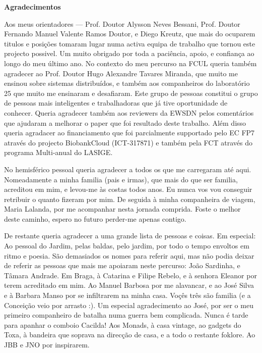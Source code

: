 \pagestyle{plain}

\vspace*{2cm}
\begin{center}
\Large \bf Agradecimentos
\end{center}
\vspace*{1cm} \setlength{\baselineskip}{0.6cm}
Aos meus orientadores --- Prof. Doutor Alysson Neves Bessani, Prof. Doutor Fernando Manuel Valente Ramos Doutor, e  Diego Kreutz, que mais do ocuparem titulos e posições tomaram lugar numa activa equipa de trabalho que tornou este projecto possivel. 
Um muito obrigado por toda a paciência, apoio, e confiança ao longo do meu último ano. 
No contexto do meu percurso na FCUL queria também agradecer ao Prof. Doutor Hugo Alexandre Tavares Miranda, que muito me ensinou sobre sistemas distribuídos, e também aos companheiros do laboratório 25 que muito me ensinaram e desafiaram. Este grupo de pessoas constitui o grupo de  pessoas mais inteligentes  e trabalhadoras que já tive oportunidade de conhecer. 
Queria agradecer também aos reviewers da EWSDN pelos comentários que ajudaram a melhorar o paper que foi resultado deste trabalho. Além disso queria agradacer ao financiamento que foi parcialmente supportado pelo EC FP7 através do projecto BiobankCloud (ICT-317871) e também pela FCT através do programa Multi-anual do LASIGE. 

No hemisférico pessoal queria agradecer a todos os que me carregaram até aqui. Nomeadamente a minha familia (pais e irmas), que mais do que ser familia, acreditou em mim, e levou-me às costas todos anos. Eu nunca vos vou conseguir retribuir o quanto fizeram por mim. 
De seguida à minha  companheira de viagem, Maria Lalanda, por me acompanhar nesta jornada comprida. Foste o melhor deste caminho, espero no futuro perder-me apenas contigo. 

De restante queria agradecer a uma grande lista de pessoas e coisas. Em especial: 
Ao pessoal do Jardim, pelas baldas, pelo jardim, por todo o tempo envoltos em ritmo e poesia. São demasiados os nomes para referir aqui, mas não podia deixar de referir as pessoas que mais me apoiaram neste percurso: João Sardinha, e Tâmara Andrade. 
Em Braga, à Catarina e Filipe Rebelo, e à senhora Eleanor por terem acreditado em mim.  Ao Manuel Barbosa por me alavancar, e ao  José Silva e à Barbara Manso por se infiltrarem na minha casa. Voçês três são familia (e a Conceição veio por arrasto :). Um especial agradecimento ao José, por ser o meu primeiro companheiro de batalha numa guerra bem complicada. Nunca é tarde para apanhar o comboio Cacilda! Aos Monads, à casa vintage, ao gadgets do Toxa, à bandeira que soprava na direcção de casa, e a todo o restante foklore. Ao JBB e JNO por inspirarem. 

